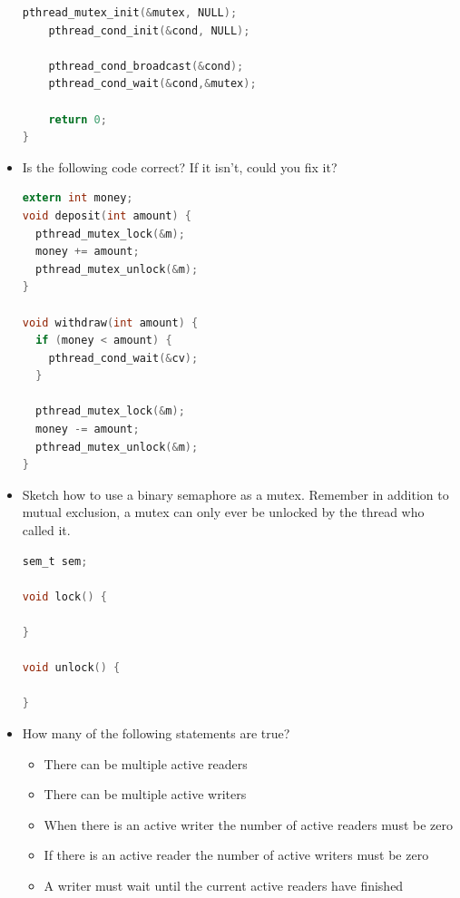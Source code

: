 \begin{itemize}
\begin{lstlisting}[language=C]
    pthread_mutex_init(&mutex, NULL);
    pthread_cond_init(&cond, NULL);

    pthread_cond_broadcast(&cond);
    pthread_cond_wait(&cond,&mutex);

    return 0;
}
\end{lstlisting}
\item
  Is the following code correct? If it isn't, could you fix it?
\begin{lstlisting}[language=C]
extern int money;
void deposit(int amount) {
  pthread_mutex_lock(&m);
  money += amount;
  pthread_mutex_unlock(&m);
}

void withdraw(int amount) {
  if (money < amount) {
    pthread_cond_wait(&cv);
  }

  pthread_mutex_lock(&m);
  money -= amount;
  pthread_mutex_unlock(&m);
}
\end{lstlisting}
\item
  Sketch how to use a binary semaphore as a mutex. Remember in addition to mutual exclusion, a mutex can only ever be unlocked by the thread who called it.
\begin{lstlisting}[language=C]
sem_t sem;

void lock() {

}

void unlock() {

}
\end{lstlisting}
\item
  How many of the following statements are true?

        \begin{itemize}
        \item
        There can be multiple active readers
        \item
        There can be multiple active writers
        \item
        When there is an active writer the number of active readers must be zero
        \item
        If there is an active reader the number of active writers must be zero
        \item
        A writer must wait until the current active readers have finished
        \end{itemize}
\end{itemize}



